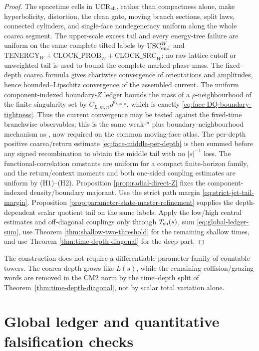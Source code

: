 \documentclass[11pt]{article}
\begin{document}
\begin{proof}
The spacetime cells in $\mathrm{UCR}_{\rm sh}$, rather than compactness alone, make
hyperbolicity, distortion, the clean gate, moving branch sections, split
laws, connected cylinders, and single-face nondegeneracy uniform along the
whole coarea segment.  The
upper-scale excess tail and every energy-tree failure are uniform on the
same complete tilted labels by $\mathrm{USC}_{\rm end}^{W}$ and
$\mathrm{TENERGY}_{W}+\mathrm{CLOCK\_PROB}_{W}
+\mathrm{CLOCK\_SRC}_{W}$; no raw lattice cutoff or unweighted tail is used to
bound the complete marked phase mass.  The
fixed-depth coarea formula gives chartwise convergence of orientations and
amplitudes, hence bounded--Lipschitz convergence of the assembled current.
The uniform component-indexed boundary-$Z$ ledger bounds the mass of a
$\rho$-neighbourhood of the finite singularity set by
$C_{L,m,n}\rho^{\theta_{L,m,n}}$, which is exactly
\eqref{eq:face-DQ-boundary-tightness}.  Thus the current convergence may be
tested against the fixed-time branchwise observables; this is the same
weak-* plus boundary-neighbourhood mechanism as
\cite[Lemma~5.4]{CanestrariHoles}, now required on the common moving-face
atlas.  The per-depth positive coarea/return estimate
\eqref{eq:face-middle-per-depth} is then summed before any signed
recombination to obtain the middle tail with no $|s|^{-1}$ loss.  The
functional-correlation constants are uniform for a compact finite-horizon
family, and the return/context moments and both one-sided coupling estimates
are uniform by \textup{(H1)--(H2)}.  Proposition
\ref{prop:radial-direct-Z} fixes the component-indexed density/boundary
majorant.  Use the strict path margin
\eqref{eq:strict-jet-tail-margin}.  Proposition
\ref{prop:parameter-state-master-refinement} supplies the
depth-dependent scalar quotient tail on the same labels.  Apply the low/high
central estimates and off-diagonal couplings only through $T_{\rm sh}(s)$,
sum \eqref{eq:global-ledger-sum}, use Theorem
\ref{thm:shallow-two-threshold} for the remaining shallow times, and use Theorem
\ref{thm:time-depth-diagonal} for the deep part.
\end{proof}

The construction does not require a differentiable parameter family of
countable towers.  The coarea depth grows like $L(s)$, while the remaining
collision/grazing words are removed in the CM2 norm by the time--depth split
of Theorem~\ref{thm:time-depth-diagonal}, not by scalar total variation alone.

\section{Global ledger and quantitative falsification checks}
\end{document}
